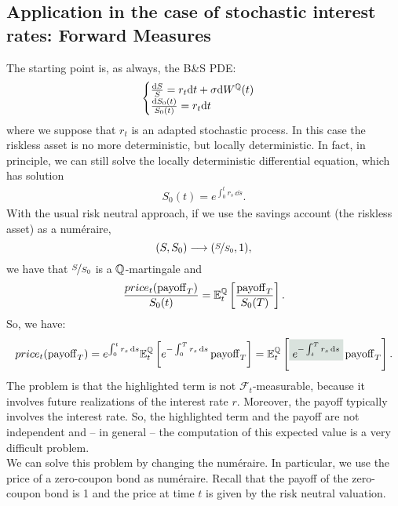 \subsection[Forward Measures]{Application in the case of stochastic interest rates: Forward Measures} %
The starting point is, as always, the B\&S PDE:
\begin{equation}
    \begin{cases}
    \frac{\dd S}{S} = r_t\dd t + \sigma\dd W^{\mathbb{Q}}(t) \\
    \frac{\dd S_0(t)}{S_0(t)} = r_t\dd t
    \end{cases}
\end{equation}
where we suppose that $r_t$ is an adapted stochastic process. In this case the riskless asset is no more deterministic, but locally deterministic. In fact, in principle, we can still solve the locally deterministic differential equation, which has solution
\begin{align*}
    S_0(t) = e^{\int_0^t r_s\,\dd s}.
\end{align*}
With the usual risk neutral approach, if we use the savings account (the riskless asset) as a numéraire,
\begin{equation}
    (S,S_0)\longrightarrow(\nicefrac{S}{S_0},1),
\end{equation}
we have that $\nicefrac{S}{S_0}$ is a $\mathbb{Q}$-martingale and
\begin{equation}
    \frac{price_t(\operatorname{payoff}_T)}{S_0(t)} = \mathbb{E}_t^{\mathbb{Q}} \left[\frac{\operatorname{payoff}_T}{S_0(T)}\right].
\end{equation}
So, we have:
\begin{equation}\label{label0}
    price_t(\pay_T) = e^{\int_0^t r_s\,\dd s}\mathbb{E}_t^{\Qmeas} \left[e^{-\int_0^T r_s\,\dd s}\pay_T\right] = \mathbb{E}_t^{\Qmeas} \left[\hlc{mytweed}{e^{-\int_t^T r_s\,\dd s}}\pay_T\right].
\end{equation}
The problem is that the highlighted term is not $\mathcal{F}_t$-measurable, because it involves future realizations of the interest rate $r$. Moreover, the payoff typically involves the interest rate. So, the highlighted term and the payoff are not independent and -- in general -- the computation of this expected value is a very difficult problem.\\
We can solve this problem by changing the numéraire. In particular, we use the price of a zero-coupon bond as numéraire. Recall that the payoff of the zero-coupon bond is 1 and the price at time $t$ is given by the risk neutral valuation.
\medbreak
